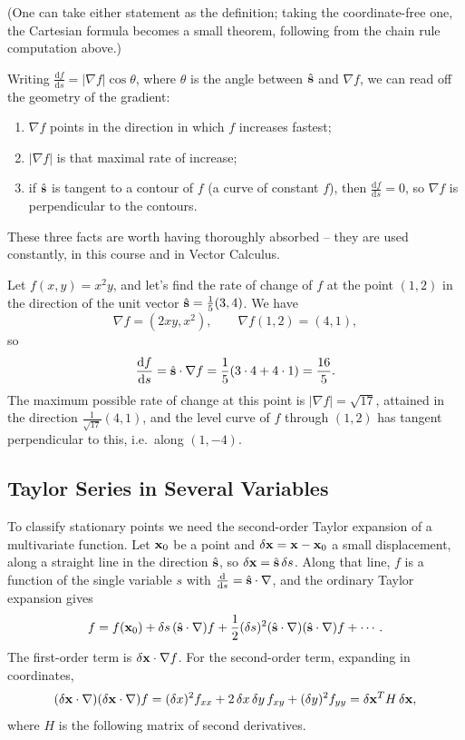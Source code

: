 \documentclass[a4paper]{scrartcl}
\newcommand{\hh}[1]{\hat{\vv{#1}}}
\begin{document}
(One can take either statement as the definition; taking the coordinate-free one, the Cartesian formula becomes a small theorem, following from the chain rule computation above.)

Writing $\frac{\mathrm{d}f}{\mathrm{d}s} = |\nabla f| \cos\theta$, where $\theta$ is the angle between $\hh s$ and $\nabla f$, we can read off the geometry of the gradient:
\begin{enumerate}[label=(\roman*)]
	\item $\nabla f$ points in the direction in which $f$ increases fastest;
	\item $|\nabla f|$ is that maximal rate of increase;
	\item if $\hh s$ is tangent to a contour of $f$ (a curve of constant $f$), then $\frac{\mathrm{d}f}{\mathrm{d}s} = 0$, so $\nabla f$ is perpendicular to the contours.
\end{enumerate}
These three facts are worth having thoroughly absorbed -- they are used constantly, in this course and in Vector Calculus.

\begin{example}
	Let $f(x, y) = x^2 y$, and let's find the rate of change of $f$ at the point $(1, 2)$ in the direction of the unit vector $\hh s = \frac{1}{5}(3, 4)$. We have
	$$
	\nabla f = (2xy, x^2), \qquad \nabla f(1, 2) = (4, 1),
	$$
	so
	$$
	\frac{\mathrm{d}f}{\mathrm{d}s} = \hh s \cdot \nabla f = \frac{1}{5}(3 \cdot 4 + 4 \cdot 1) = \frac{16}{5}.
	$$
	The maximum possible rate of change at this point is $|\nabla f| = \sqrt{17}$, attained in the direction $\frac{1}{\sqrt{17}}(4, 1)$, and the level curve of $f$ through $(1, 2)$ has tangent perpendicular to this, i.e.\ along $(1, -4)$.
\end{example}

\subsection{Taylor Series in Several Variables}

To classify stationary points we need the second-order Taylor expansion of a multivariate function. Let $\mathbf{x}_0$ be a point and $\delta \mathbf{x} = \mathbf{x} - \mathbf{x}_0$ a small displacement, along a straight line in the direction $\hh s$, so $\delta \vv x = \hh s \, \delta s$. Along that line, $f$ is a function of the single variable $s$ with $\frac{\mathrm{d}}{\mathrm{d}s} = \hh s \cdot \nabla$, and the ordinary Taylor expansion gives
$$
f = f(\vv x_0) + \delta s \, (\hh s \cdot \nabla) f + \frac{1}{2}(\delta s)^2 (\hh s \cdot \nabla)(\hh s \cdot \nabla) f + \cdots.
$$
The first-order term is $\delta \mathbf{x} \cdot \nabla f$. For the second-order term, expanding in coordinates,
$$
(\delta \mathbf{x} \cdot \nabla)(\delta \mathbf{x} \cdot \nabla) f = (\delta x)^2 f_{xx} + 2\, \delta x\, \delta y\, f_{xy} + (\delta y)^2 f_{yy} = \delta\mathbf{x}^T H \,\delta \mathbf{x},
$$
where $H$ is the following matrix of second derivatives.
\end{document}
